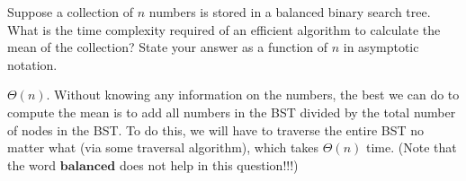 \begin{prob}
    Suppose a collection of $n$ numbers is stored in a balanced binary
    search tree. What is the time complexity required of an efficient algorithm
    to calculate the mean of the collection? State your answer as a function of
    $n$ in asymptotic notation.

    \begin{soln}
        $\Theta(n)$. Without knowing any information on the numbers, the best we can 
        do to compute the mean is to add all numbers in the BST divided by the total 
        number of nodes in the BST. To do this, we will have to traverse the entire 
        BST no matter what (via some traversal algorithm), which takes $\Theta(n)$ time. 
        (Note that the word $\textbf{balanced}$ does not help in this question!!!)
    \end{soln}

\end{prob}
